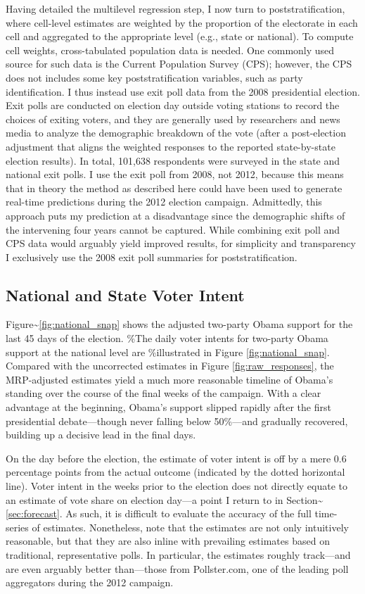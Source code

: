 Having detailed the multilevel regression step, I now turn to
poststratification, where cell-level estimates are weighted by the
proportion of the electorate in each cell and aggregated to the
appropriate level (e.g., state or national). To compute cell weights,
cross-tabulated population data is needed. One commonly used source for
such data is the Current Population Survey (CPS); however, the CPS does
not includes some key poststratification variables, such as party
identification. I thus instead use exit poll data from the 2008
presidential election. Exit polls are conducted on election day outside
voting stations to record the choices of exiting voters, and they are
generally used by researchers and news media to analyze the demographic
breakdown of the vote (after a post-election adjustment that aligns the
weighted responses to the reported state-by-state election results). In
total, 101,638 respondents were surveyed in the state and national exit
polls. I use the exit poll from 2008, not 2012, because this means that
in theory the method as described here could have been used to generate
real-time predictions during the 2012 election campaign. Admittedly,
this approach puts my prediction at a disadvantage since the demographic
shifts of the intervening four years cannot be captured. While combining
exit poll and CPS data would arguably yield improved results, for
simplicity and transparency I exclusively use the 2008 exit poll
summaries for poststratification.

\subsection{National and State Voter
Intent}\label{national-and-state-voter-intent}

Figure\textasciitilde{}\ref{fig:national_snap} shows the adjusted
two-party Obama support for the last 45 days of the election. \%The
daily voter intents for two-party Obama support at the national level
are \%illustrated in Figure \ref{fig:national_snap}. Compared with the
uncorrected estimates in Figure \ref{fig:raw_responses}, the
MRP-adjusted estimates yield a much more reasonable timeline of Obama's
standing over the course of the final weeks of the campaign. With a
clear advantage at the beginning, Obama's support slipped rapidly after
the first presidential debate---though never falling below 50\%---and
gradually recovered, building up a decisive lead in the final days.

On the day before the election, the estimate of voter intent is off by a
mere 0.6 percentage points from the actual outcome (indicated by the
dotted horizontal line). Voter intent in the weeks prior to the election
does not directly equate to an estimate of vote share on election
day---a point I return to in Section\textasciitilde{}\ref{sec:forecast}.
As such, it is difficult to evaluate the accuracy of the full
time-series of estimates. Nonetheless, note that the estimates are not
only intuitively reasonable, but that they are also inline with
prevailing estimates based on traditional, representative polls. In
particular, the estimates roughly track---and are even arguably better
than---those from Pollster.com, one of the leading poll aggregators
during the 2012 campaign.

